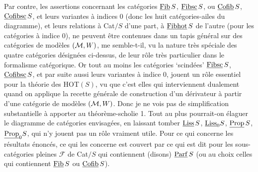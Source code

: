Par contre, les assertions concernant les catégories $\underline{\mathrm{Fib}}\, S$, $\underline{\mathrm{Fibsc}}\, S$, ou $\underline{\mathrm{Cofib}}\, S$, $\underline{\mathrm{Cofibsc}}\, S$, et leurs variantes à indices 0 (donc les huit catégories-ailes du diagramme), et leurs relations à Cat$/S$ d'une part, à $\underline{\mathrm{Fibhot}}\, S$ de l'autre (pour les catégories à indice 0), ne peuvent être contenues dans un tapis général sur des catégories de modèles $(\mathcal{M}, W)$, me semble-t-il, vu la nature très spéciale des quatre catégories désignées ci-dessus, de leur rôle très particulier dans le formalisme catégorique. Or tout au moins les catégories ‘scindées’ $\underline{\mathrm{Fibsc}}\, S$, $\underline{\mathrm{Cofibsc}}\, S$, et par suite aussi leurs variantes à indice 0, jouent un rôle essentiel pour la théorie des HOT$(S)$, vu que c'est elles qui
interviennent dualement quand on applique la recette générale de construction d'un dérivateur à partir d'une catégorie de modèles $(\mathcal{M}, W)$. Donc je ne vois pas de simplification
substantielle à apporter au théorème-scholie 1. Tout au plus pourrait-on élaguer le diagramme de catégories envisagées, en laissant tomber $\underline{\mathrm{Liss}}\,S$, $\underline{\mathrm{Liss}}_0 S$, $\underline{\mathrm{Prop}}\,S$, $\underline{\mathrm{Prop}}_0 S$, qui n'y jouent pas un rôle vraiment utile. Pour ce qui concerne les résultats énoncés, ce qui les concerne est couvert par ce qui est dit pour les sous-catégories pleines $\mathcal{F}$ de Cat$/S$ qui contiennent (disons) $\underline{\mathrm{Parf}}\, S$ (ou au choix celles qui contiennent $\underline{\mathrm{Fib}}\, S$ ou $\underline{\mathrm{Cofib}}\, S$).

